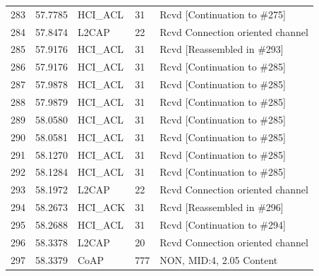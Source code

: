 \begin{table}[H]
\begin{tabular}{lllll}
283    & 57.7785 & HCI\_ACL & 31     & Rcvd {[}Continuation to \#275{]} \\
284    & 57.8474 & L2CAP    & 22     & Rcvd Connection oriented channel \\
285    & 57.9176 & HCI\_ACL & 31     & Rcvd {[}Reassembled in \#293{]}  \\
286    & 57.9176 & HCI\_ACL & 31     & Rcvd {[}Continuation to \#285{]} \\
287    & 57.9878 & HCI\_ACL & 31     & Rcvd {[}Continuation to \#285{]} \\
288    & 57.9879 & HCI\_ACL & 31     & Rcvd {[}Continuation to \#285{]} \\
289    & 58.0580 & HCI\_ACL & 31     & Rcvd {[}Continuation to \#285{]} \\
290    & 58.0581 & HCI\_ACL & 31     & Rcvd {[}Continuation to \#285{]} \\
291    & 58.1270 & HCI\_ACL & 31     & Rcvd {[}Continuation to \#285{]} \\
292    & 58.1284 & HCI\_ACL & 31     & Rcvd {[}Continuation to \#285{]} \\
293    & 58.1972 & L2CAP    & 22     & Rcvd Connection oriented channel \\
294    & 58.2673 & HCI\_ACK & 31     & Rcvd {[}Reassembled in \#296{]}  \\
295    & 58.2688 & HCI\_ACL & 31     & Rcvd {[}Continuation to \#294{]} \\
296    & 58.3378 & L2CAP    & 20     & Rcvd Connection oriented channel \\
297    & 58.3379 & CoAP     & 777    & NON, MID:4, 2.05 Content         \\ \hline
\end{tabular}
\end{table}


